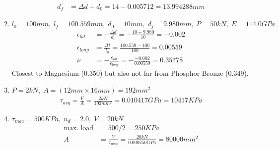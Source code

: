 \documentclass[11pt]{article}
\begin{document}
\begin{enumerate}
\begin{align*}
                  d_f                                    & = \Delta d + d_0 = 14-0.005712=13.994288mm
            \end{align*}
      \item $l_0 = 100mm,\; l_f=100.559mm,\; d_0=10mm,\; d_f=9.980mm,\; P=50kN,\; E=114.0GPa$
            \begin{align*}
                  \epsilon_{lat}  & = -\frac{\Delta d}{d_0} =-\frac{10-9.980}{10} = -0.002                        \\
                  \epsilon_{long} & = \frac{\Delta l}{l_0} =\frac{100.559-100}{100} = 0.00559                     \\
                  \nu             & = -\frac{\epsilon_{lat}}{\epsilon_{long}} = -\frac{-0.002}{0.00559} = 0.35778
            \end{align*}
            Closest to Magnesium (0.350) but also not far from Phosphor Bronze (0.349).
      \item $P=2kN,\; A = (12mm \times 16mm) = 192mm^2$
            \begin{align*}
                  \tau_{avg} = \frac{V}{A} = \frac{2kN}{192mm^2} = 0.010417 GPa = 10417 KPa
            \end{align*}
      \item $\tau_{max} = 500KPa,\; n_d=2.0, \; V=20kN$
            \begin{align*}
                  \mathrm{max. \; load} & = 500/2 = 250KPa \\
                  A &= \frac{V}{\tau_{max}} = \frac{20kN}{0.000250GPa} = 80000mm^2
            \end{align*}
\end{enumerate}
\end{document}
